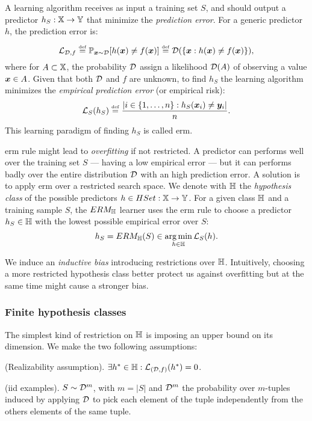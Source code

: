 A learning algorithm receives as input a training set $S$, and should
output a predictor $h_S:\mathbb{X}\rightarrow\mathbb{Y}$ that minimize the
\emph{prediction error}. For a generic predictor $h$, the prediction
error is:
\begin{equation*}
  \mathcal{L}_{\mathcal{D},f}\overset{\underset{\mathrm{def}}{}}{=}\mathbb{P}_{\bm{x}\sim\mathcal{D}}[h(\bm{x})\neq
  f(\bm{x})]\overset{\underset{\mathrm{def}}{}}{=}\mathcal{D}(\{\bm{x}:h(\bm{x})\neq
  f(\bm{x})\}),
\end{equation*}
where for $A\subset\mathbb{X}$, the probability $\mathcal{D}$ assign a
likelihood $\mathcal{D}(A)$ of observing a value $\bm{x}\in A$. Given
that both $\mathcal{D}$ and $f$ are unknown, to find $h_S$ the learning
algorithm minimizes the \emph{empirical prediction error} (or
empirical risk):
\begin{equation*}
  \mathcal{L}_S(h_S)\overset{\underset{\mathrm{def}}{}}{=}\frac{|i\in\{1,\dots,n\}:h_S(\bm{x}_i)\neq\bm{y}_i|}{n}.
\end{equation*}
This learning paradigm of finding $h_S$ is called \ac{erm}.

\ac{erm} rule might lead to \emph{overfitting} if not restricted. A predictor
can performs well over the training set $S$ --- having a low empirical
error --- but it can performs badly over the entire distribution
$\mathcal{D}$ with an high prediction error. A solution is to apply
\ac{erm} over a restricted search space. We denote with $\mathbb{H}$ the
\emph{hypothesis class} of the possible predictors
$h\in{HSet}:\mathbb{X}\rightarrow\mathbb{Y}$. For a given class $\mathbb{H}$ and a
training sample $S$, the $ERM_{\mathbb{H}}$ learner uses the \ac{erm} rule to
choose a predictor $h_S\in\mathbb{H}$ with the lowest possible empirical
error over $S$:
\begin{equation*}
  h_S=ERM_{\mathbb{H}}(S)\in \operatorname*{arg\,min}_{h\in\mathbb{H}} \mathcal{L}_S(h).
\end{equation*}

We induce an \emph{inductive bias} introducing restrictions over
$\mathbb{H}$. Intuitively, choosing a more restricted hypothesis class
better protect us against overfitting but at the same time might cause
a stronger bias.

\subsubsection{Finite hypothesis classes}
The simplest kind of restriction on $\mathbb{H}$ is
imposing an upper bound on its dimension. We make the two following
assumptions: 
\begin{definition}
  (Realizability assumption). $\exists h^*\in\mathbb{H} : \mathcal{L}_{(\mathcal{D},f)}(h^*)=0$.
\end{definition}
\begin{definition}
  (\ac{iid} examples). $S\sim\mathcal{D}^m$, with $m=|S|$ and $\mathcal{D}^m$ the
  probability over $m$-tuples induced by applying $\mathcal{D}$ to pick
  each element of the tuple independently from the others elements of
  the same tuple.
\end{definition}

